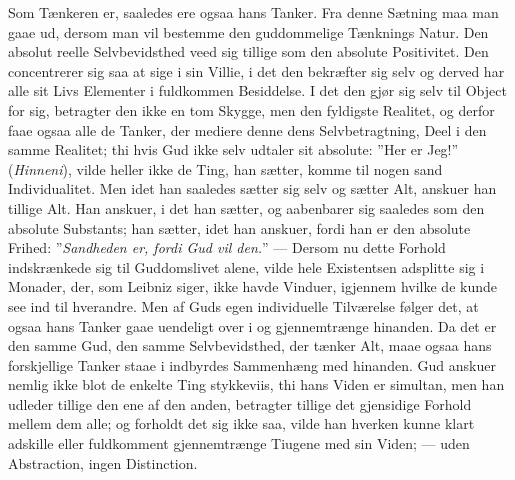 \documentclass[12pt]{book}
\newcommand{\opage}[1]{\marginnote{\footnotesize\textit{[#1]}}}
\begin{document}
Som Tænkeren er, saaledes ere ogsaa hans Tanker. Fra denne Sætning maa man gaae
ud, dersom man vil bestemme den guddommelige Tænknings Natur. Den absolut
reelle Selvbevidsthed veed sig tillige som den absolute Positivitet. Den
concentrerer sig saa at sige i sin Villie, i det den bekræfter sig selv og
derved har alle sit Livs Elementer i fuldkommen Besiddelse. I det den gjør sig
selv til Object for sig, betragter den ikke en tom Skygge, men den fyldigste
Realitet, og derfor faae ogsaa alle de Tanker, der mediere denne dens
Selvbetragtning, Deel i den samme Realitet; thi hvis Gud ikke selv udtaler sit
absolute: ”Her er Jeg!” (\emph{Hinneni}), vilde heller ikke de Ting, han
sætter, komme til nogen sand Individualitet. Men idet han saaledes sætter sig
selv og sætter Alt, anskuer han tillige Alt. Han anskuer, i det han sætter, og
aabenbarer sig saaledes som den absolute Substants; han sætter, idet han
anskuer, fordi han er den absolute Frihed: ”\emph{Sandheden er, fordi Gud vil
den.}” --- Dersom nu dette Forhold indskrænkede sig til Guddomslivet alene,
vilde hele Existentsen adsplitte sig i Monader, der, som Leibniz siger, ikke
havde Vinduer, igjennem hvilke de kunde see ind til hverandre. Men af Guds egen
individuelle Tilværelse følger det, at ogsaa hans Tanker gaae uendeligt over i
og gjennemtrænge hinanden. Da det er den samme Gud, den samme Selvbevidsthed,
der tænker Alt, maae ogsaa hans forskjellige Tanker staae i indbyrdes
Sammenhæng med hinanden. Gud anskuer nemlig ikke blot de enkelte Ting
stykkeviis, thi hans Viden er simultan, men han udleder tillige den ene af den
anden, betragter tillige det gjensidige Forhold mellem dem alle; og forholdt
det sig ikke saa, vilde han hverken kunne klart adskille eller
\opage{44} fuldkomment gjennemtrænge Tiugene med sin Viden; --- uden Abstraction, ingen
Distinction.
\end{document}
